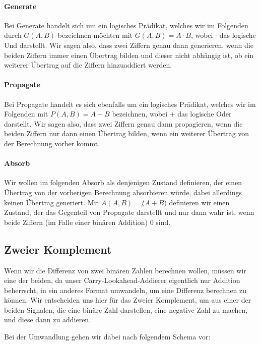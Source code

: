 \documentclass{report}
\begin{document}
\paragraph{Generate}

Bei Generate handelt sich um ein logisches Prädikat, welches wir im Folgenden durch $G(A, B)$ bezeichnen möchten mit $G(A,B) = A \cdot B$, wobei $\cdot$ das logische Und darstellt. Wir sagen also, dass zwei Ziffern genau dann generieren, wenn die beiden Ziffern immer einen Übertrag bilden und dieser nicht abhängig ist, ob ein weiterer Übertrag auf die Ziffern hinzuaddiert werden.

\paragraph{Propagate}

Bei Propagate handelt es sich ebenfalls um ein logisches Prädikat, welches wir im Folgenden mit $P(A,B) = A + B$ bezeichnen, wobei $+$ das logische Oder darstellt. Wir sagen also, dass zwei Ziffern genau dann propagieren, wenn die beiden Ziffern nur dann einen Übertrag bilden, wenn ein weiterer Übertrag von der Berechnung vorher kommt.

\paragraph{Absorb}

Wir wollen im folgenden Absorb als denjenigen Zustand definieren, der einen Übertrag von der vorherigen Berechnung absorbieren würde, dabei allerdings keinen Übertrag generiert. Mit $A(A,B) = \not(A + B)$ definieren wir einen Zustand, der das Gegenteil von Propagate darstellt und nur dann wahr ist, wenn beide Ziffern (im Falle einer binären Addition) $0$ sind.

\subsection{Zweier Komplement}
\label{sec:zweier-komplement}

Wenn wir die Differenz von zwei binären Zahlen berechnen wollen, müssen wir eine der beiden, da unser Carry-Lookahead-Addierer eigentlich nur Addition beherrscht, in ein anderes Format umwandeln, um eine Differenz berechnen zu können. Wir entscheiden uns hier für das Zweier Komplement, um aus einer der beiden Signalen, die eine binäre Zahl darstellen, eine negative Zahl zu machen, und diese dann zu addieren.

Bei der Umwandlung gehen wir dabei nach folgendem Schema vor:
\end{document}
